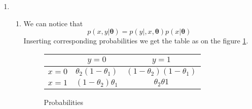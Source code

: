 \documentclass[10pt,a4paper]{article}
\begin{document}
\begin{enumerate}
\begin{enumerate}
\begin{align}
 +\transpose{\left(\expectation \left[ \hat{\textbf{w}}(\mathcal{D}) \right]\right)} 
 \expectation \left[ \hat{\textbf{w}}(\mathcal{D}) \right] 
 \right] \label{eq:dis3}\\
 &=  \expectation \left[ \transpose{(\hat{\textbf{w}}(\mathcal{D}))}
 \hat{\textbf{w}}(\mathcal{D})
 \right]
 -\transpose{\left(\expectation \left[ \hat{\textbf{w}}(\mathcal{D}) \right]\right)}
 \expectation \left[ \hat{\textbf{w}}(\mathcal{D}) \right]-
 \nonumber \\
 &-\expectation \left[ \transpose{(\hat{\textbf{w}}(\mathcal{D}))} \right]
 \expectation \left[ \hat{\textbf{w}}(\mathcal{D}) \right] 
 +\transpose{\left(\expectation \left[ \hat{\textbf{w}}(\mathcal{D}) \right]\right)} 
 \expectation \left[ \hat{\textbf{w}}(\mathcal{D}) \right] 
\label{eq:prop3} \\ 
 &=\expectation \left[ \transpose{(\hat{\textbf{w}}(\mathcal{D}))}
 \hat{\textbf{w}}(\mathcal{D})
 \right]
 -\transpose{\left(\expectation \left[ \hat{\textbf{w}}(\mathcal{D}) \right]\right)} 
 \expectation \left[ \hat{\textbf{w}}(\mathcal{D}) \right]
 \label{eq:last3}
\end{align}

The equation \ref{eq:product3} is the other way to calculate Eucleadean norm using scalar product. The equation \ref{eq:dis3} is simple distributivity law.  The equation \ref{eq:prop3} uses properties of mathematical expectation. The last equation \ref{eq:last3} uses only a property that a scalar product of a column and a row vector is equal to their transposed product. 
\\
By adding equations \ref{eq:last2} and \ref{eq:last3} we get the expression from \ref{eq:last}.
\end{enumerate}
\item
\begin{enumerate}
\item[1.]
We can notice that $$p(x, y \vert \mathbf{\theta})=p (y\vert, x, \mathbf{\theta})p(x|\mathbf{\theta})$$
Inserting corresponding probabilities we get the table as on the figure \ref{fig:Prob}.

\begin{figure}[htb!]
\begin{center}
\begin{tabular}{c|cc}
 & $y=0$ & $y=1$ \\ 
\hline 
$x=0$ & $\theta_2(1-\theta_1)$ & $(1-\theta_2)(1-\theta_1)$ \\ 
$x=1$ & $(1-\theta_2)\theta_1$ & $\theta_2\theta1$ \\ 
\end{tabular} 
\end{center}
\caption{Probabilities}
\label{fig:Prob}
\end{figure}


\end{enumerate}
\end{enumerate}
\end{document}
